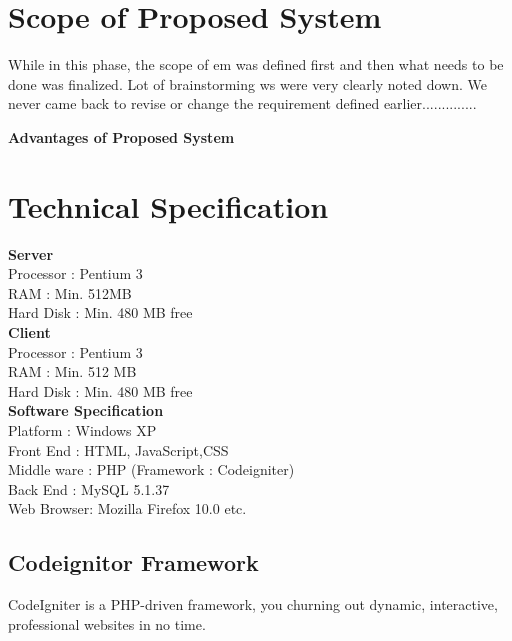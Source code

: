 \label{fig:Prototype Model}


\section{Scope of Proposed System}
While in this phase, the scope of em was defined first and then what needs to be done was finalized. Lot of brainstorming ws were very clearly noted down. 
We never came back to revise or change the requirement defined earlier..............

\textbf{Advantages of Proposed System }\\





\section{Technical Specification}
\textbullet \hspace{0.2cm} \textbf{Server}\\
Processor	:	Pentium 3\\
RAM          	: 	Min. 512MB\\
Hard Disk	: 	Min. 480 MB free\\
\textbullet \hspace{0.2cm} \textbf{Client}\\
Processor   	: 	Pentium 3\\
RAM           	: 	Min. 512 MB\\
Hard Disk	: 	Min. 480 MB free\\
\textbullet \hspace{0.2cm} \textbf{Software Specification}\\
Platform	:  	Windows XP\\
Front End	: 	HTML, JavaScript,CSS \\
Middle ware	: 	PHP (Framework : Codeigniter)\\
Back End	: 	MySQL 5.1.37 \\	
Web Browser: 	Mozilla Firefox 10.0 etc. \\


\subsection{Codeignitor Framework}
CodeIgniter is a PHP-driven framework, you churning out dynamic, interactive, professional websites in no time.\\

